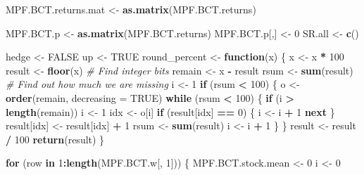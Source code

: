 \documentclass[]{article}
\newenvironment{Shaded}{\begin{snugshade}}{\end{snugshade}}
\newcommand{\CommentTok}[1]{\textcolor[rgb]{0.56,0.35,0.01}{\textit{#1}}}
\newcommand{\ControlFlowTok}[1]{\textcolor[rgb]{0.13,0.29,0.53}{\textbf{#1}}}
\newcommand{\DataTypeTok}[1]{\textcolor[rgb]{0.13,0.29,0.53}{#1}}
\newcommand{\DecValTok}[1]{\textcolor[rgb]{0.00,0.00,0.81}{#1}}
\newcommand{\KeywordTok}[1]{\textcolor[rgb]{0.13,0.29,0.53}{\textbf{#1}}}
\newcommand{\NormalTok}[1]{#1}
\newcommand{\OperatorTok}[1]{\textcolor[rgb]{0.81,0.36,0.00}{\textbf{#1}}}
\newcommand{\OtherTok}[1]{\textcolor[rgb]{0.56,0.35,0.01}{#1}}
\newcommand{\StringTok}[1]{\textcolor[rgb]{0.31,0.60,0.02}{#1}}
\begin{document}
\begin{Shaded}
\begin{Highlighting}[]
\NormalTok{MPF.BCT.returns.mat <-}\StringTok{ }\KeywordTok{as.matrix}\NormalTok{(MPF.BCT.returns)}

\NormalTok{MPF.BCT.p <-}\StringTok{ }\KeywordTok{as.matrix}\NormalTok{(MPF.BCT.returns)}
\NormalTok{MPF.BCT.p[,] <-}\StringTok{ }\DecValTok{0}
\NormalTok{SR.all <-}\StringTok{ }\KeywordTok{c}\NormalTok{()}


\NormalTok{hedge <-}\StringTok{ }\OtherTok{FALSE}
\NormalTok{up <-}\StringTok{ }\OtherTok{TRUE}
\NormalTok{round_percent <-}\StringTok{ }\ControlFlowTok{function}\NormalTok{(x) \{}
\NormalTok{  x <-}\StringTok{ }\NormalTok{x }\OperatorTok{*}\StringTok{ }\DecValTok{100}
\NormalTok{  result <-}\StringTok{ }\KeywordTok{floor}\NormalTok{(x)    }\CommentTok{# Find integer bits}
\NormalTok{  remain <-}\StringTok{ }\NormalTok{x }\OperatorTok{-}\StringTok{ }\NormalTok{result}
\NormalTok{  rsum <-}\StringTok{ }\KeywordTok{sum}\NormalTok{(result)   }\CommentTok{# Find out how much we are missing}
\NormalTok{  i <-}\StringTok{ }\DecValTok{1}
  \ControlFlowTok{if}\NormalTok{ (rsum }\OperatorTok{<}\StringTok{ }\DecValTok{100}\NormalTok{) \{}
\NormalTok{    o <-}\StringTok{ }\KeywordTok{order}\NormalTok{(remain, }\DataTypeTok{decreasing =} \OtherTok{TRUE}\NormalTok{)}
    \ControlFlowTok{while}\NormalTok{ (rsum }\OperatorTok{<}\StringTok{ }\DecValTok{100}\NormalTok{) \{}
      \ControlFlowTok{if}\NormalTok{ (i }\OperatorTok{>}\StringTok{ }\KeywordTok{length}\NormalTok{(remain))}
\NormalTok{        i <-}\StringTok{ }\DecValTok{1}
\NormalTok{      idx <-}\StringTok{ }\NormalTok{o[i]}
      \ControlFlowTok{if}\NormalTok{ (result[idx] }\OperatorTok{==}\StringTok{ }\DecValTok{0}\NormalTok{) \{}
\NormalTok{        i <-}\StringTok{ }\NormalTok{i }\OperatorTok{+}\StringTok{ }\DecValTok{1}
        \ControlFlowTok{next}
\NormalTok{      \}}
\NormalTok{      result[idx] <-}\StringTok{ }\NormalTok{result[idx] }\OperatorTok{+}\StringTok{ }\DecValTok{1}
\NormalTok{      rsum <-}\StringTok{ }\KeywordTok{sum}\NormalTok{(result)}
\NormalTok{      i <-}\StringTok{ }\NormalTok{i }\OperatorTok{+}\StringTok{ }\DecValTok{1}
\NormalTok{    \}}
\NormalTok{  \}}
\NormalTok{  result <-}\StringTok{ }\NormalTok{result }\OperatorTok{/}\StringTok{ }\DecValTok{100}
  \KeywordTok{return}\NormalTok{(result)}
\NormalTok{\}}


\ControlFlowTok{for}\NormalTok{ (row }\ControlFlowTok{in} \DecValTok{1}\OperatorTok{:}\KeywordTok{length}\NormalTok{(MPF.BCT.w[, }\DecValTok{1}\NormalTok{])) \{}
\NormalTok{  MPF.BCT.stock.mean <-}\StringTok{ }\DecValTok{0}
\NormalTok{  i <-}\StringTok{ }\DecValTok{0}
  

\end{Highlighting}
\end{Shaded}
\end{document}
